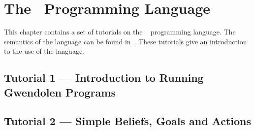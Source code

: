 %
\chapter{The \gwendolen\ Programming Language}
\label{chap:gwendolen}

This chapter contains a set of tutorials on the \gwendolen\  programming language.  The semantics of the language can be found in~\cite{dennis17gwen}.  These tutorials give an introduction to the use of the language.

\section{Tutorial 1 --- Introduction to Running Gwendolen Programs}

{
  \let\section\subsection
  \let\subsection\subsubsection
  \let\subsubsection\paragraph
  
  
  }

\section{Tutorial 2 --- Simple Beliefs, Goals and Actions}

